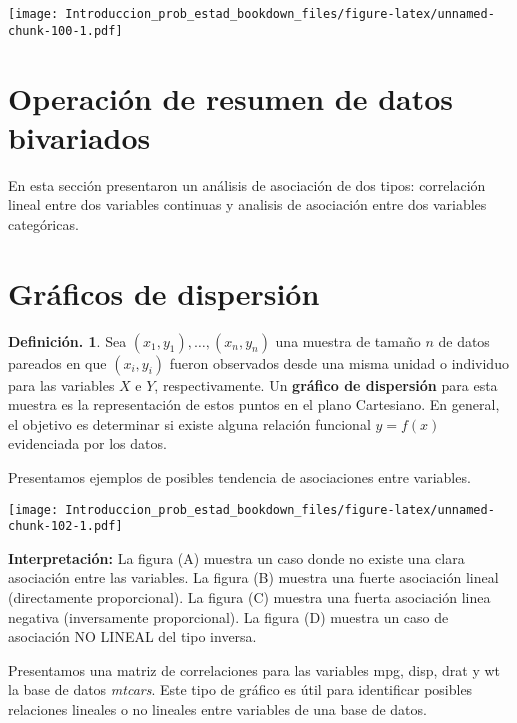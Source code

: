 \documentclass[]{book}
\theoremstyle{definition}
\newtheorem{definition}{Definición.}[chapter]
\theoremstyle{definition}
\theoremstyle{definition}
\theoremstyle{remark}
\begin{document}
\texttt{[image: Introduccion\_prob\_estad\_bookdown\_files/figure-latex/unnamed-chunk-100-1.pdf]}

\hypertarget{operaciuxf3n-de-resumen-de-datos-bivariados}{%
\section{Operación de resumen de datos bivariados}\label{operaciuxf3n-de-resumen-de-datos-bivariados}}

En esta sección presentaron un análisis de asociación de
dos tipos: correlación lineal entre dos variables
continuas y analisis de
asociación entre dos variables categóricas.

\hypertarget{gruxe1ficos-de-dispersiuxf3n}{%
\section{Gráficos de dispersión}\label{gruxe1ficos-de-dispersiuxf3n}}

\begin{definition}
\protect\hypertarget{def:unnamed-chunk-101}{}{\label{def:unnamed-chunk-101} }Sea \((x_1, y_1), \ldots, (x_n, y_n)\) una muestra
de tamaño \(n\) de
datos pareados en que \((x_i,y_i)\) fueron
observados desde una
misma unidad o individuo para las variables \(X\) e
\(Y\),
respectivamente. Un \textbf{gráfico de dispersión} para
esta muestra es
la representación de estos puntos en el plano
Cartesiano. En
general, el objetivo es determinar si existe
alguna relación
funcional \(y=f(x)\) evidenciada por los datos.
\end{definition}

Presentamos ejemplos de posibles tendencia de
asociaciones entre variables.

\texttt{[image: Introduccion\_prob\_estad\_bookdown\_files/figure-latex/unnamed-chunk-102-1.pdf]}

\textbf{Interpretación:} La figura (A) muestra un caso
donde no existe una clara asociación entre las
variables. La figura (B) muestra una fuerte
asociación lineal (directamente proporcional). La
figura (C) muestra una fuerta asociación linea
negativa (inversamente proporcional). La figura
(D) muestra un caso de asociación NO LINEAL del
tipo inversa.

Presentamos una matriz de correlaciones para las
variables mpg,
disp, drat y wt la base de datos \emph{mtcars}. Este
tipo de gráfico es útil para identificar posibles
relaciones lineales o no lineales entre variables
de una base de datos.
\end{document}
